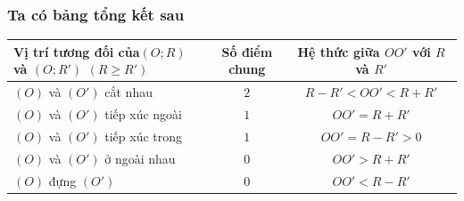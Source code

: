 \begin{tomtat}
\subsubsection*{Ta có bảng tổng kết sau}
\begin{center}
	\begin{tabular}{|l|c|c|}
	\hline
	Vị trí tương đối của$\left(O;R \right)$ và $\left(O;R' \right)$ $\left(R \geq R'\right)$	&Số điểm chung&Hệ thức giữa $OO'$ với $R$ và $R'$\\ 
	\hline
	$\left(O \right)$ và $\left(O' \right)$ cắt nhau
	&$2$
	&$R-R'<OO'<R+R'$\\ 
	\hline
	$\left(O \right)$ và $\left(O' \right)$ tiếp xúc ngoài
	&$1$
	&$OO'=R+R'$\\
	\hline
	$\left(O \right)$ và $\left(O' \right)$ tiếp xúc trong
	&$1$
	&$OO'=R-R'>0$\\
	\hline
	$\left(O \right)$ và $\left(O' \right)$ ở ngoài nhau
	&$0$
	&$OO'>R+R'$\\
	\hline
	$\left(O \right)$ đựng $\left(O' \right)$
	&$0$
	&$OO'<R-R'$\\
	\hline
	\end{tabular}
\end{center}
\end{tomtat}
